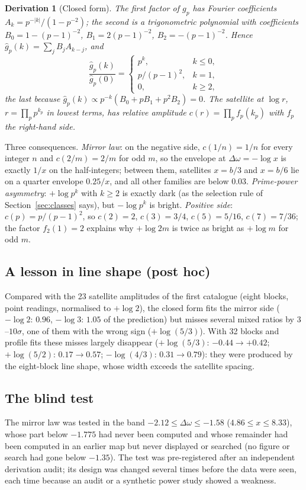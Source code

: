 \documentclass[12pt]{amsart}
\newtheorem{derivation}[observation]{Derivation}
\begin{document}
\begin{derivation}[Closed form]\label{der:closed}
The first factor of $g_p$ has Fourier coefficients
$A_k = p^{-|k|}/(1 - p^{-2})$; the second is a trigonometric polynomial with
coefficients $B_0 = 1 - (p-1)^{-2}$, $B_1 = 2(p-1)^{-2}$,
$B_2 = -(p-1)^{-2}$. Hence $\hat g_p(k) = \sum_j B_j A_{k-j}$, and
\[
\frac{\hat g_p(k)}{\hat g_p(0)} =
\begin{cases} p^{k}, & k \le 0,\\ p/(p-1)^2, & k = 1,\\ 0, & k\ge 2,\end{cases}
\]
the last because $\hat g_p(k) \propto p^{-k}(B_0 + pB_1 + p^2 B_2) = 0$.
The satellite at $\log r$, $r = \prod_p p^{k_p}$ in lowest terms, has
relative amplitude $c(r) = \prod_p f_p(k_p)$ with $f_p$ the right-hand
side.
\end{derivation}

Three consequences. \emph{Mirror law}: on the negative side,
$c(1/n) = 1/n$ for every integer $n$ and $c(2/m) = 2/m$ for odd $m$, so the
envelope at $\Delta\omega = -\log x$ is exactly $1/x$ on the half-integers;
between them, satellites $x = b/3$ and $x = b/6$ lie on a quarter envelope
$0.25/x$, and all other families are below $0.03$. \emph{Prime-power
asymmetry}: $+\log p^k$ with $k\ge2$ is exactly dark (as the selection rule
of Section~\ref{sec:classes} says), but $-\log p^k$ is bright.
\emph{Positive side}: $c(p) = p/(p-1)^2$, so $c(2) = 2$, $c(3) = 3/4$,
$c(5) = 5/16$, $c(7) = 7/36$; the factor $f_2(1) = 2$ explains why
$+\log 2m$ is twice as bright as $+\log m$ for odd $m$.

\subsection*{A lesson in line shape (post hoc)}
Compared with the 23 satellite amplitudes of the first catalogue (eight
blocks, point readings, normalised to $+\log2$), the closed form fits the
mirror side ($-\log 2$: $0.96$, $-\log 3$: $1.05$ of the prediction) but
misses several mixed ratios by $3$--$10\sigma$, one of them with the wrong
sign ($+\log(5/3)$). With 32 blocks and profile fits these misses largely
disappear ($+\log(5/3)$: $-0.44 \to +0.42$; $+\log(5/2)$: $0.17\to0.57$;
$-\log(4/3)$: $0.31\to0.79$): they were produced by the eight-block line
shape, whose width exceeds the satellite spacing.

\subsection*{The blind test}
The mirror law was tested in the band $-2.12 \le \Delta\omega \le -1.58$
($4.86 \le x \le 8.33$), whose part below $-1.775$ had never been computed and whose
remainder had been computed in an earlier map but never displayed or
searched (no figure or search had gone below $-1.35$). The test was
pre-registered after an independent derivation audit; its design was
changed several times before the data were seen, each time because an
audit or a synthetic power study showed a weakness.
\end{document}
